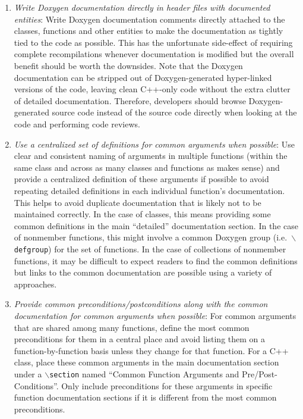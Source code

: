 \begin{enumerate}

{}\item\textit{Write Doxygen documentation directly in header files with
documented entities}: Write Doxygen documentation comments directly attached
to the classes, functions and other entities to make the documentation as
tightly tied to the code as possible.  This has the unfortunate side-effect of
requiring complete recompilations whenever documentation is modified but the
overall benefit should be worth the downsides.  Note that the Doxygen
documentation can be stripped out of Doxygen-generated hyper-linked versions of
the code, leaving clean C++-only code without the extra clutter of detailed
documentation.  Therefore, developers should browse Doxygen-generated source
code instead of the source code directly when looking at the code and
performing code reviews.

{}\item\textit{Use a centralized set of definitions for common arguments when
possible}: Use clear and consistent naming of arguments in multiple functions
(within the same class and across as many classes and functions as makes
sense) and provide a centralized definition of these arguments if possible to
avoid repeating detailed definitions in each individual function's
documentation.  This helps to avoid duplicate documentation that is likely not
to be maintained correctly.  In the case of classes, this means providing some
common definitions in the main ``detailed'' documentation section.  In the
case of nonmember functions, this might involve a common Doxygen group (i.e.\
{}\texttt{$\backslash$defgroup}) for the set of functions.  In the case of
collections of nonmember functions, it may be difficult to expect readers to
find the common definitions but links to the common documentation are possible
using a variety of approaches.

{}\item\textit{Provide common preconditions/postconditions along with the
common documentation for common arguments when possible}: For common arguments
that are shared among many functions, define the most common preconditions for
them in a central place and avoid listing them on a function-by-function basis
unless they change for that function.  For a C++ class, place these common
arguments in the main documentation section under a
{}\texttt{$\backslash$section} named ``Common Function Arguments and
Pre/Post-Conditions''.  Only include preconditions for these arguments in
specific function documentation sections if it is different from the most
common preconditions.


\end{enumerate}
